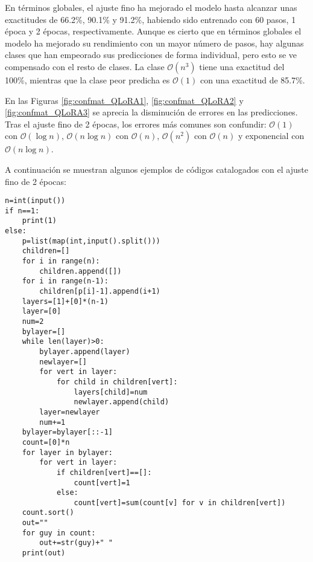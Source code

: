 \documentclass[12pt,twoside]{article}
\begin{document}
En términos globales, el ajuste fino ha mejorado el modelo hasta alcanzar unas exactitudes de 66.2\%, 90.1\% y 91.2\%, habiendo sido entrenado con 60 pasos, 1 época y 2 épocas, respectivamente. Aunque es cierto que en términos globales el modelo ha mejorado su rendimiento con un mayor número de pasos, hay algunas clases que han empeorado sus predicciones de forma individual, pero esto se ve compensado con el resto de clases. La clase $\mathcal{O}(n^3)$ tiene una exactitud del 100\%, mientras que la clase peor predicha es $\mathcal{O}(1)$ con una exactitud de 85.7\%.

En las Figuras \ref{fig:confmat_QLoRA1}, \ref{fig:confmat_QLoRA2} y \ref{fig:confmat_QLoRA3} se aprecia la disminución de errores en las predicciones. Tras el ajuste fino de 2 épocas, los errores más comunes son confundir: $\mathcal{O}(1)$ con $\mathcal{O}(\log n)$, $\mathcal{O}(n\log n)$ con $\mathcal{O}(n)$, $\mathcal{O}(n^2)$ con $\mathcal{O}(n)$ y exponencial con $\mathcal{O}(n\log n)$.

A continuación se muestran algunos ejemplos de códigos catalogados con el ajuste fino de 2 épocas:

\begin{tcolorbox}[
  colback=gray!5,
  colframe=black,
  boxrule=0.5pt,
  breakable,
  title=$\mathcal{O}(n^2)$ catalogado como $\mathcal{O}(n)$,
]
\begin{verbatim}
n=int(input())
if n==1:
    print(1)
else:
    p=list(map(int,input().split()))
    children=[]
    for i in range(n):
        children.append([])
    for i in range(n-1):
        children[p[i]-1].append(i+1)
    layers=[1]+[0]*(n-1)
    layer=[0]
    num=2
    bylayer=[]
    while len(layer)>0:
        bylayer.append(layer)
        newlayer=[]
        for vert in layer:
            for child in children[vert]:
                layers[child]=num
                newlayer.append(child)
        layer=newlayer
        num+=1
    bylayer=bylayer[::-1]
    count=[0]*n
    for layer in bylayer:
        for vert in layer:
            if children[vert]==[]:
                count[vert]=1
            else:
                count[vert]=sum(count[v] for v in children[vert])
    count.sort()
    out=""
    for guy in count:
        out+=str(guy)+" "
    print(out)
\end{verbatim}
\end{tcolorbox}
\end{document}
